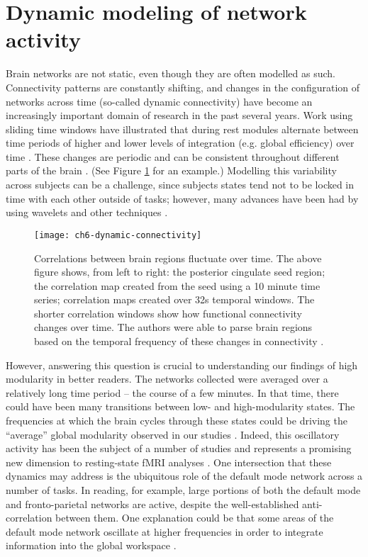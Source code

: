 \section{Dynamic modeling of network activity}

Brain networks are not static, even though they are often modelled as such. Connectivity patterns are constantly shifting, and changes in the configuration of networks across time (so-called dynamic connectivity) have become an increasingly important domain of research in the past several years. Work using sliding time windows have illustrated that during rest modules alternate between time periods of higher and lower levels of integration (e.g. global efficiency) over time \citep{Zalesky2014}. These changes are periodic and can be consistent throughout different parts of the brain \citep{Handwerker2012}. (See Figure \ref{fig:ch6-dynamic-connectivity} for an example.) Modelling this variability across subjects can be a challenge, since subjects states tend not to be locked in time with each other outside of tasks; however, many advances have been had by using wavelets and other techniques \citep{Zalesky2014}. 

\begin{figure}[t]
	\centering
	\texttt{[image: ch6-dynamic-connectivity]}
	\caption[Correlations between brain regions fluctuate over time]{Correlations between brain regions fluctuate over time. The above figure shows, from left to right: the posterior cingulate seed region; the correlation map created from the seed using a 10 minute time series; correlation maps created over 32s temporal windows. The shorter correlation windows show how functional connectivity changes over time. The authors were able to parse brain regions based on the temporal frequency of these changes in connectivity \citep{Handwerker2012}.}
	\label{fig:ch6-dynamic-connectivity}
\end{figure}

However, answering this question is crucial to understanding our findings of high modularity in better readers. The networks collected were averaged over a relatively long time period -- the course of a few minutes. In that time, there could have been many transitions between low- and high-modularity states. The frequencies at which the brain cycles through these states could be driving the ``average'' global modularity observed in our studies \citep{Fries2005}. Indeed, this oscillatory activity has been the subject of a number of studies and represents a promising new dimension to resting-state fMRI analyses \citep{Hutchison2013}. One intersection that these dynamics may address is the ubiquitous role of the default mode network across a number of tasks. In reading, for example, large portions of both the default mode and fronto-parietal networks are active, despite the well-established anti-correlation between them. One explanation could be that some areas of the default mode network oscillate at higher frequencies in order to integrate information into the global workspace \citep{Vatansever2015}.

